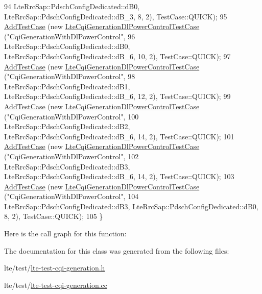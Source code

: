 \begin{DoxyCode}
94                                                            LteRrcSap::PdschConfigDedicated::dB0, 
      LteRrcSap::PdschConfigDedicated::dB\_3, 8, 2), TestCase::QUICK);
95   \hyperlink{classns3_1_1TestCase_a3718088e3eefd5d6454569d2e0ddd835}{AddTestCase} (\textcolor{keyword}{new} \hyperlink{classLteCqiGenerationDlPowerControlTestCase}{LteCqiGenerationDlPowerControlTestCase} 
      (\textcolor{stringliteral}{"CqiGenerationWithDlPowerControl"},
96                                                            LteRrcSap::PdschConfigDedicated::dB0, 
      LteRrcSap::PdschConfigDedicated::dB\_6, 10, 2), TestCase::QUICK);
97   \hyperlink{classns3_1_1TestCase_a3718088e3eefd5d6454569d2e0ddd835}{AddTestCase} (\textcolor{keyword}{new} \hyperlink{classLteCqiGenerationDlPowerControlTestCase}{LteCqiGenerationDlPowerControlTestCase} 
      (\textcolor{stringliteral}{"CqiGenerationWithDlPowerControl"},
98                                                            LteRrcSap::PdschConfigDedicated::dB1, 
      LteRrcSap::PdschConfigDedicated::dB\_6, 12, 2), TestCase::QUICK);
99   \hyperlink{classns3_1_1TestCase_a3718088e3eefd5d6454569d2e0ddd835}{AddTestCase} (\textcolor{keyword}{new} \hyperlink{classLteCqiGenerationDlPowerControlTestCase}{LteCqiGenerationDlPowerControlTestCase} 
      (\textcolor{stringliteral}{"CqiGenerationWithDlPowerControl"},
100                                                            LteRrcSap::PdschConfigDedicated::dB2, 
      LteRrcSap::PdschConfigDedicated::dB\_6, 14, 2), TestCase::QUICK);
101   \hyperlink{classns3_1_1TestCase_a3718088e3eefd5d6454569d2e0ddd835}{AddTestCase} (\textcolor{keyword}{new} \hyperlink{classLteCqiGenerationDlPowerControlTestCase}{LteCqiGenerationDlPowerControlTestCase} 
      (\textcolor{stringliteral}{"CqiGenerationWithDlPowerControl"},
102                                                            LteRrcSap::PdschConfigDedicated::dB3, 
      LteRrcSap::PdschConfigDedicated::dB\_6, 14, 2), TestCase::QUICK);
103   \hyperlink{classns3_1_1TestCase_a3718088e3eefd5d6454569d2e0ddd835}{AddTestCase} (\textcolor{keyword}{new} \hyperlink{classLteCqiGenerationDlPowerControlTestCase}{LteCqiGenerationDlPowerControlTestCase} 
      (\textcolor{stringliteral}{"CqiGenerationWithDlPowerControl"},
104                                                            LteRrcSap::PdschConfigDedicated::dB3, 
      LteRrcSap::PdschConfigDedicated::dB0, 8, 2), TestCase::QUICK);
105 \}
\end{DoxyCode}


Here is the call graph for this function\+:




The documentation for this class was generated from the following files\+:\begin{DoxyCompactItemize}
\item 
lte/test/\hyperlink{lte-test-cqi-generation_8h}{lte-\/test-\/cqi-\/generation.\+h}\item 
lte/test/\hyperlink{lte-test-cqi-generation_8cc}{lte-\/test-\/cqi-\/generation.\+cc}\end{DoxyCompactItemize}
